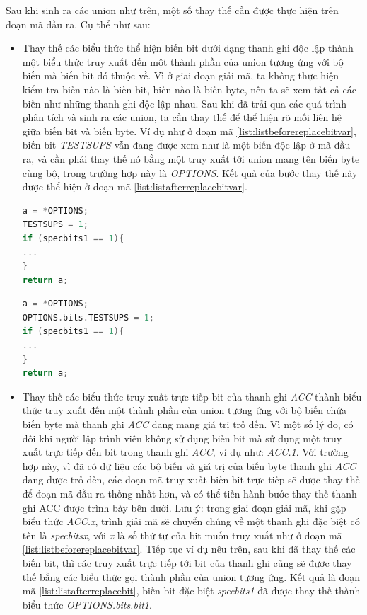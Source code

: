 Sau khi sinh ra các union như trên, một số thay thế cần được thực hiện trên đoạn mã đầu ra. Cụ thể như sau:
\begin{itemize}
\item Thay thế các biểu thức thể hiện biến bit dưới dạng thanh ghi độc lập thành một biểu thức truy xuất đến một thành phần của union tương ứng với bộ biến mà biến bit đó thuộc về. Vì ở giai đoạn giải mã, ta không thực hiện kiểm tra biến nào là biến bit, biến nào là biến byte, nên ta sẽ xem tất cả các biến như những thanh ghi độc lập nhau. Sau khi đã trải qua các quá trình phân tích và sinh ra các union, ta cần thay thế để thể hiện rõ mối liên hệ giữa biến bit và biến byte. Ví dụ như ở đoạn mã \ref{list:listbeforereplacebitvar}, biến bit \textit{TESTSUPS} vẫn đang được xem như là một biến độc lập ở mã đầu ra, và cần phải thay thế nó bằng một truy xuất tới union mang tên biến byte cùng bộ, trong trường hợp này là \textit{OPTIONS}. Kết quả của bước thay thế này được thể hiện ở đoạn mã \ref{list:listafterreplacebitvar}.
\begin{lstlisting}[caption={Mã đầu ra trước khi thực hiện các bước thay thế},label={list:listbeforereplacebitvar}, language = c]
a = *OPTIONS;
TESTSUPS = 1;
if (specbits1 == 1){
...
}
return a;
\end{lstlisting}

\begin{lstlisting}[caption={Mã đầu ra sau khi thực hiện bước thay thế biến bit},label={list:listafterreplacebitvar}, language = c]
a = *OPTIONS;
OPTIONS.bits.TESTSUPS = 1;
if (specbits1 == 1){
...
}
return a;
\end{lstlisting}
\item Thay thế các biểu thức truy xuất trực tiếp bit của thanh ghi \textit{ACC} thành biểu thức truy xuất đến một thành phần của union tương ứng với bộ biến chứa biến byte mà thanh ghi \textit{ACC} đang mang giá trị trỏ đến. Vì một số lý do, có đôi khi người lập trình viên không sử dụng biến bit mà sử dụng một truy xuất trực tiếp đến bit trong thanh ghi \textit{ACC}, ví dụ như: \textit{ACC.1}. Với trường hợp này, vì đã có dữ liệu các bộ biến và giá trị của biến byte thanh ghi \textit{ACC} đang được trỏ đến, các đoạn mã truy xuất biến bit trực tiếp sẽ được thay thế để đoạn mã đầu ra thống nhất hơn, và có thể tiến hành bước thay thế thanh ghi ACC được trình bày bên dưới. Lưu ý: trong giai đoạn giải mã, khi gặp biểu thức \textit{ACC.x}, trình giải mã sẽ chuyển chúng về một thanh ghi đặc biệt có tên là \textit{specbitsx}, với \textit{x} là số thứ tự của bit muốn truy xuất như ở đoạn mã \ref{list:listbeforereplacebitvar}. Tiếp tục ví dụ nêu trên, sau khi đã thay thế các biến bit, thì các truy xuất trực tiếp tới bit của thanh ghi cũng sẽ được thay thế bằng các biểu thức gọi thành phần của union tương ứng. Kết quả là đoạn mã \ref{list:listafterreplacebit}, biến bit đặc biệt \textit{specbits1} đã được thay thế thành biểu thức \textit{OPTIONS.bits.bit1}.


\end{itemize}
